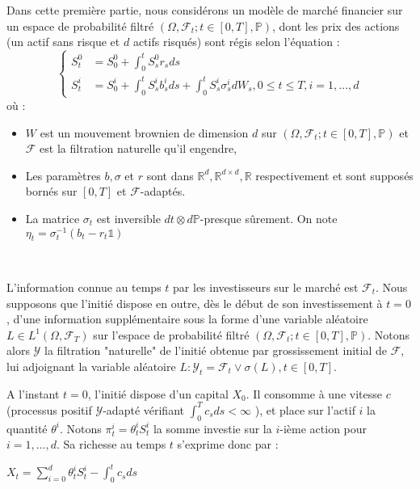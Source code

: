 \documentclass[../finalreport.tex]{subfiles}
\begin{document}
\par Dans cette première partie, nous considérons un modèle de marché financier sur un espace de probabilité filtré $(\Omega, \mathcal{F}_t; t \in [0,T], \mathbb{P})$, dont les prix des actions (un actif sans risque et $d$ actifs risqués) sont régis selon l'équation : 
\begin{equation}\label{equation_prices}
\begin{cases}
S^0_t &= S_0^0 + \displaystyle \int_{0}^{t} S^0_s r_s ds \\
S_t^i &= S_0^i + \displaystyle \int_{0}^{t} S_s^i b_s^i ds +  \int_{0}^{t} S_s^i \sigma_s^i dW_s, 0\leq t \leq T, i = 1,...,d
\end{cases}
\end{equation}
où :

\begin{itemize}
\item $W$ est un mouvement brownien de dimension $d$ sur $(\Omega, \mathcal{F}_t; t \in [0,T], \mathbb{P})$ et $\mathcal{F}$ est la filtration naturelle qu'il engendre,
\item Les paramètres $b, \sigma$ et $r$ sont dans $\mathbb{R}^d, \mathbb{R}^{d\times d}, \mathbb{R}$ respectivement et sont supposés bornés sur $[0,T]$ et $\mathcal{F}$-adaptés.
\item La matrice $\sigma_t$ est inversible $dt \otimes d\mathbb{P}$-presque sûrement. On note $\eta_t = \sigma_t^{-1} \left( b_t - r_t \mathds{1} \right)$ 
\end{itemize}
\

\par L'information connue au temps $t$ par les investisseurs sur le marché est $\mathcal{F}_t$.
Nous supposons que l'initié dispose en outre, dès le début de son investissement à $t=0$, d'une information supplémentaire sous la forme d'une variable aléatoire $L \in L^1(\Omega, \mathcal{F}_T)$ sur l'espace de probabilité filtré $(\Omega, \mathcal{F}_t; t \in [0,T], \mathbb{P})$. 
Notons alors $\mathcal{Y}$ la filtration "naturelle" de l'initié obtenue par grossissement initial de $\mathcal{F}$, lui adjoignant la variable aléatoire $L : \mathcal{Y}_t = \mathcal{F}_t \vee \sigma(L), t \in [0, T]$.\\

\par A l'instant $t=0$, l'initié dispose d'un capital $X_0$. Il consomme à une vitesse $c$ (processus positif $\mathcal{Y}$-adapté vérifiant $\int_{0}^{T} c_s ds < \infty$ ), et place sur l'actif $i$ la quantité $\theta^i$. Notons $\pi_t^i = \theta^i_t S_t^i$ la somme investie sur la $i$-ième action pour $i =1, ..., d$. Sa richesse au temps $t$ s'exprime donc par : 
\begin{center}
$X_t = \displaystyle \sum_{i=0}^{d} \theta^i_t S_t^i - \int_{0}^{t} c_s ds$
\end{center}
\end{document}
